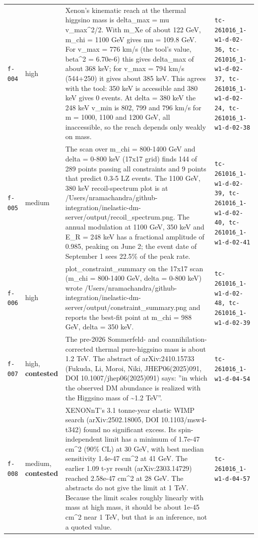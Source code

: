 \documentclass[11pt,a4paper]{article}
\begin{document}
\begin{longtable}{@{}p{}p{}p{}p{}@{}}
\texttt{f-004} & high & Xenon's kinematic reach at the thermal higgsino mass is delta\_max = mu v\_max\textasciicircum{}2/2. With m\_Xe of about 122 GeV, m\_chi = 1100 GeV gives mu = 109.8 GeV. For v\_max = 776 km/s (the tool's value, beta\textasciicircum{}2 = 6.70e-6) this gives delta\_max of about 368 keV; for v\_max = 794 km/s (544+250) it gives about 385 keV. This agrees with the tool: 350 keV is accessible and 380 keV gives 0 events. At delta = 380 keV the 248 keV v\_min is 802, 799 and 796 km/s for m = 1000, 1100 and 1200 GeV, all inaccessible, so the reach depends only weakly on mass. & \texttt{tc-261016\_\allowbreak{}1-w1-d-02-36,\allowbreak{} tc-261016\_\allowbreak{}1-w1-d-02-37,\allowbreak{} tc-261016\_\allowbreak{}1-w1-d-02-24,\allowbreak{} tc-261016\_\allowbreak{}1-w1-d-02-38} \\
\texttt{f-005} & medium & The scan over m\_chi = 800-1400 GeV and delta = 0-800 keV (17x17 grid) finds 144 of 289 points passing all constraints and 9 points that predict 0.3-5 LZ events. The 1100 GeV, 380 keV recoil-spectrum plot is at /Users/nramachandra/github-integration/inelastic-dm-server/output/recoil\_spectrum.png. The annual modulation at 1100 GeV, 350 keV and E\_R = 248 keV has a fractional amplitude of 0.985, peaking on June 2; the event date of September 1 sees 22.5\% of the peak rate. & \texttt{tc-261016\_\allowbreak{}1-w1-d-02-39,\allowbreak{} tc-261016\_\allowbreak{}1-w1-d-02-40,\allowbreak{} tc-261016\_\allowbreak{}1-w1-d-02-41} \\
\texttt{f-006} & high & plot\_constraint\_summary on the 17x17 scan (m\_chi = 800-1400 GeV, delta = 0-800 keV) wrote /Users/nramachandra/github-integration/inelastic-dm-server/output/constraint\_summary.png and reports the best-fit point at m\_chi = 988 GeV, delta = 350 keV. & \texttt{tc-261016\_\allowbreak{}1-w1-d-02-48,\allowbreak{} tc-261016\_\allowbreak{}1-w1-d-02-39} \\
\texttt{f-007} & high, \textbf{contested} & The pre-2026 Sommerfeld- and coannihilation-corrected thermal pure-higgsino mass is about 1.2 TeV. The abstract of arXiv:2410.15733 (Fukuda, Li, Moroi, Niki, JHEP06(2025)091, DOI 10.1007/jhep06(2025)091) says: ''in which the observed DM abundance is realized with the Higgsino mass of \textasciitilde{}1.2 TeV''. & \texttt{tc-261016\_\allowbreak{}1-w1-d-04-54} \\
\texttt{f-008} & medium, \textbf{contested} & XENONnT's 3.1 tonne-year elastic WIMP search (arXiv:2502.18005, DOI 10.1103/msw4-t342) found no significant excess. Its spin-independent limit has a minimum of 1.7e-47 cm\textasciicircum{}2 (90\% CL) at 30 GeV, with best median sensitivity 1.4e-47 cm\textasciicircum{}2 at 41 GeV. The earlier 1.09 t-yr result (arXiv:2303.14729) reached 2.58e-47 cm\textasciicircum{}2 at 28 GeV. The abstracts do not give the limit at 1 TeV. Because the limit scales roughly linearly with mass at high mass, it should be about 1e-45 cm\textasciicircum{}2 near 1 TeV, but that is an inference, not a quoted value. & \texttt{tc-261016\_\allowbreak{}1-w1-d-04-57} \\

\end{longtable}
\end{document}
